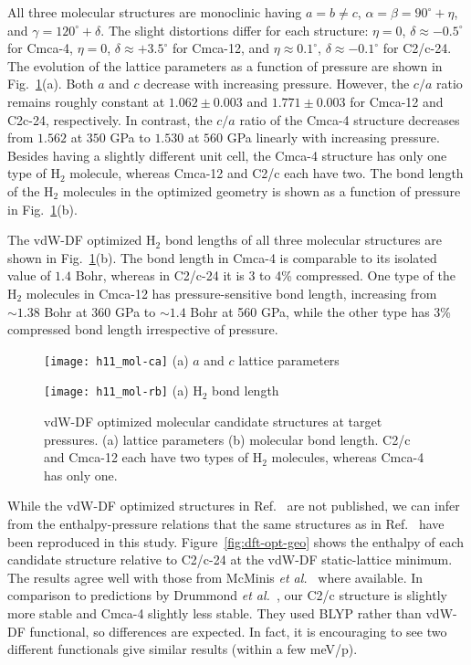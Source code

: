 All three molecular structures are monoclinic having $a=b\neq c$, $\alpha=\beta=90^\circ+\eta$, and $\gamma=120^\circ+\delta$. The slight distortions differ for each structure: $\eta=0$, $\delta\approx -0.5^\circ$ for Cmca-4, $\eta=0$, $\delta\approx+3.5^\circ$ for Cmca-12, and $\eta\approx0.1^\circ$, $\delta\approx-0.1^\circ$ for C2/c-24.
The evolution of the lattice parameters as a function of pressure are shown in Fig.~\ref{fig:hsolid-vdw-ca}(a).
Both $a$ and $c$ decrease with increasing pressure.
However, the $c/a$ ratio remains roughly constant at $1.062\pm0.003$ and $1.771\pm0.003$ for Cmca-12 and C2c-24, respectively.
In contrast, the $c/a$ ratio of the Cmca-4 structure decreases from $1.562$ at $350$ GPa to $1.530$ at $560$ GPa linearly with increasing pressure.
Besides having a slightly different unit cell, the Cmca-4 structure has only one type of H$_2$ molecule, whereas Cmca-12 and C2/c each have two.
The bond length of the H$_2$ molecules in the optimized geometry is shown as a function of pressure in Fig.~\ref{fig:hsolid-vdw-ca}(b).

The vdW-DF optimized H$_2$ bond lengths of all three molecular structures are shown in Fig.~\ref{fig:hsolid-vdw-ca}(b).
The bond length in Cmca-4 is comparable to its isolated value of $1.4$ Bohr, whereas in C2/c-24 it is 3 to 4\% compressed.
One type of the H$_2$ molecules in Cmca-12 has pressure-sensitive bond length, increasing from $\sim 1.38$ Bohr at 360 GPa to $\sim 1.4$ Bohr at 560 GPa, while the other type has 3\% compressed bond length irrespective of pressure.

\begin{figure}[h]
\centering
\begin{minipage}{0.49\textwidth}
\centering
\texttt{[image: h11\_mol-ca]}
(a) $a$ and $c$ lattice parameters
\end{minipage}
\begin{minipage}{0.49\textwidth}
\centering
\texttt{[image: h11\_mol-rb]}
(a) H$_2$ bond length
\end{minipage}
\caption{vdW-DF optimized molecular candidate structures at target pressures. (a) lattice parameters (b) molecular bond length. C2/c and Cmca-12 each have two types of H$_2$ molecules, whereas Cmca-4 has only one.}
\label{fig:hsolid-vdw-ca}
\end{figure}

While the vdW-DF optimized structures in Ref.~\cite{McMinis2015} are not published, we can infer from the enthalpy-pressure relations that the same structures as in Ref.~\cite{McMinis2015} have been reproduced in this study. Figure~\ref{fig:dft-opt-geo} shows the enthalpy of each candidate structure relative to C2/c-24 at the vdW-DF static-lattice minimum. The results agree well with those from McMinis \textit{et al.}~\cite{McMinis2015} where available.
In comparison to predictions by Drummond \textit{et al.}~\cite{Drummond2015}, our C2/c structure is slightly more stable and Cmca-4 slightly less stable.
They used BLYP rather than vdW-DF functional, so differences are expected. In fact, it is encouraging to see two different functionals give similar results (within a few meV/p).


